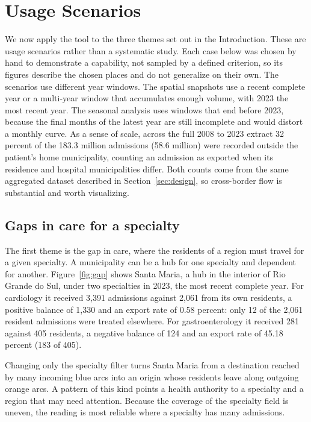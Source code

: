 \section{Usage Scenarios}
\label{sec:scenarios}

We now apply the tool to the three themes set out in the Introduction.
These are usage scenarios rather than a systematic study.
Each case below was chosen by hand to demonstrate a capability, not sampled by a defined criterion, so its figures describe the chosen places and do not generalize on their own.
The scenarios use different year windows.
The spatial snapshots use a recent complete year or a multi-year window that accumulates enough volume, with 2023 the most recent year.
The seasonal analysis uses windows that end before 2023, because the final months of the latest year are still incomplete and would distort a monthly curve.
As a sense of scale, across the full 2008 to 2023 extract 32 percent of the 183.3 million admissions (58.6 million) were recorded outside the patient's home municipality, counting an admission as exported when its residence and hospital municipalities differ.
Both counts come from the same aggregated dataset described in Section~\ref{sec:design}, so cross-border flow is substantial and worth visualizing.

\subsection{Gaps in care for a specialty}

The first theme is the gap in care, where the residents of a region must travel for a given specialty.
A municipality can be a hub for one specialty and dependent for another.
Figure~\ref{fig:gap} shows Santa Maria, a hub in the interior of Rio Grande do Sul, under two specialties in 2023, the most recent complete year.
For cardiology it received 3{,}391 admissions against 2{,}061 from its own residents, a positive balance of 1{,}330 and an export rate of 0.58 percent: only 12 of the 2{,}061 resident admissions were treated elsewhere.
For gastroenterology it received 281 against 405 residents, a negative balance of 124 and an export rate of 45.18 percent (183 of 405).

Changing only the specialty filter turns Santa Maria from a destination reached by many incoming blue arcs into an origin whose residents leave along outgoing orange arcs.
A pattern of this kind points a health authority to a specialty and a region that may need attention.
Because the coverage of the specialty field is uneven, the reading is most reliable where a specialty has many admissions.

